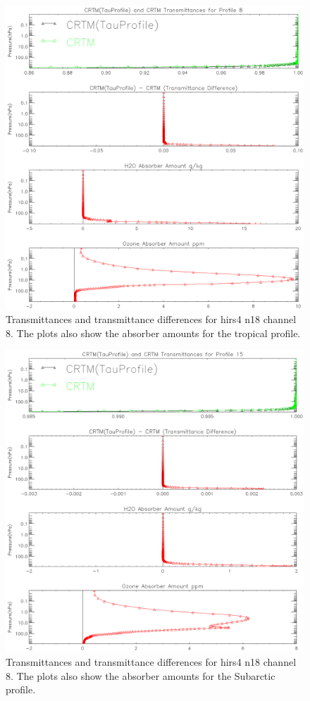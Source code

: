 \begin{figure}[htp]
  \centering{}
  \includegraphics[scale=0.8]{./graphics/Transmittance_Comparison_ch08_P08.eps}
  \caption{Transmittances and transmittance differences for hirs4 n18 channel 8. The plots also show the absorber amounts
  for the tropical profile.} 
  \label{fig:Transmittances_Tropical_ch8}
\end{figure}

\begin{figure}[htp]
  \centering{}
  \includegraphics[scale=0.8]{./graphics/Transmittance_Comparison_ch08_P15.eps}
  \caption{Transmittances and transmittance differences for hirs4 n18 channel 8. The plots also show the absorber amounts
  for the Subarctic profile.}
  \label{fig:Transmittances_Subarctic_ch8}
\end{figure}

